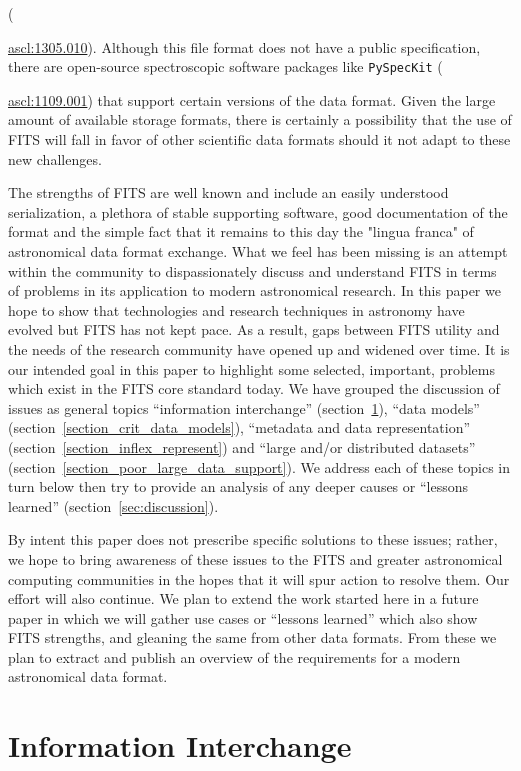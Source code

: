 \documentclass[final,authoryear,5p,times,twocolumn]{elsarticle}
\begin{document}
({\href{http://ascl.net/1305.010}{ascl:1305.010}). Although this file
format does not have a public specification,  there are open-source
spectroscopic software packages like \texttt{PySpecKit}
({\href{http://ascl.net/1109.001}{ascl:1109.001}) that support certain
versions of the data format.  Given the large amount of available
storage formats, there is certainly a possibility that the use of FITS
will fall in favor of other scientific data formats should it not adapt
to these new challenges.


The strengths of FITS are well known and include an easily understood
serialization, a plethora of stable supporting software, good documentation of
the format and the simple fact that it remains to this day the "lingua franca"
of astronomical data format exchange. What we feel has been missing is an 
attempt within the community to
dispassionately discuss and understand FITS in terms of problems in
its application to modern astronomical research. In this paper we hope to show 
that technologies and research techniques in astronomy have evolved but FITS has 
not kept pace. As a result, gaps between FITS utility and the needs of the 
research community have opened up and widened over time. 
It is our intended goal in this paper to highlight some selected, important, 
problems which exist in the FITS core standard today. 
We have grouped the discussion of issues as general topics ``information interchange''
(section~\ref{section_poor_exchange}), ``data models'' (section~\ref{section_crit_data_models}),
``metadata and data representation'' (section~\ref{section_inflex_represent}) and
``large and/or distributed datasets'' (section~\ref{section_poor_large_data_support}).
We address each of these topics in turn below then try to provide an
analysis of any deeper causes or ``lessons learned'' (section~\ref{sec:discussion}).


By intent this paper does not prescribe specific solutions to these issues;
rather, we hope to bring awareness of these issues to the FITS and greater
astronomical computing communities in the hopes that it will spur action to 
resolve them. Our effort will also continue. We plan to extend the work started 
here in a future paper in which we will gather use cases or ``lessons learned'' 
which also show FITS strengths, and gleaning the same from other data formats. 
From these we plan to extract and publish an overview of the requirements for
a modern astronomical data format.


\section{Information Interchange}
\label{section_poor_exchange}

}}
\end{document}
